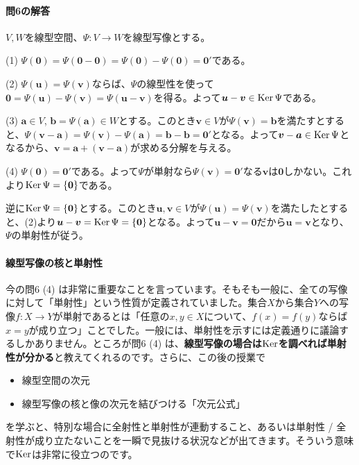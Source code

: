 \paragraph{問6の解答} $V, W$を線型空間、$\Psi\colon V\rightarrow W$を線型写像とする。

\noindent (1) $\Psi(\bm{0}) = \Psi(\bm{0} - \bm{0}) = \Psi(\bm{0}) - \Psi(\bm{0}) = \bm{0}'$である。

\noindent (2) $\Psi(\bm{u}) = \Psi(\bm{v})$ならば、$\Psi$の線型性を使って$\bm{0} = \Psi(\bm{u}) - \Psi(\bm{v}) = \Psi(\bm{u} - \bm{v})$を得る。よって$\boldsymbol{u} - \boldsymbol{v} \in \operatorname{Ker}\Psi$である。

\noindent (3) $\bm{a}\in V$, $\bm{b} = \Psi(\bm{a})\in W$とする。このとき$\bm{v}\in V$が$\Psi(\bm{v}) = \bm{b}$を満たすとすると、$\Psi(\bm{v} - \bm{a}) = \Psi(\bm{v}) - \Psi(\bm{a}) = \bm{b} - \bm{b} = \bm{0}'$となる。よって$\boldsymbol{v} - \boldsymbol{a} \in \operatorname{Ker}\Psi$となるから、$\bm{v} = \bm{a} + (\bm{v} - \bm{a})$が求める分解を与える。

\noindent (4) $\Psi(\bm{0}) = \bm{0}'$である。よって$\Psi$が単射なら$\Psi(\bm{v}) = \bm{0}'$なる$\bm{v}$は$\bm{0}$しかない。これより$\operatorname{Ker}\Psi=\{\boldsymbol{0}\}$である。

逆に$\operatorname{Ker}\Psi = \{\boldsymbol{0}\}$とする。このとき$\bm{u}, \bm{v}\in V$が$\Psi(\bm{u}) = \Psi(\bm{v})$を満たしたとすると、(2)より$\boldsymbol{u} - \boldsymbol{v} = \operatorname{Ker}\Psi = \{\boldsymbol{0}\}$となる。よって$\bm{u} - \bm{v} = \bm{0}$だから$\bm{u} = \bm{v}$となり、$\Psi$の単射性が従う。

\paragraph{線型写像の核と単射性}

今の問6 (4) は非常に重要なことを言っています。そもそも一般に、全ての写像に対して「単射性」という性質が定義されていました。集合$X$から集合$Y$への写像$f\colon X\rightarrow Y$が単射であるとは「任意の$x, y\in X$について、$f(x) = f(y)$ならば$x = y$が成り立つ」ことでした。一般には、単射性を示すには定義通りに議論するしかありません。ところが問6 (4) は、\textbf{線型写像の場合は$\operatorname{Ker}$を調べれば単射性が分かる}と教えてくれるのです。さらに、この後の授業で
\begin{itemize}
\item 線型空間の次元
\item 線型写像の核と像の次元を結びつける「次元公式」
\end{itemize}
を学ぶと、特別な場合に全射性と単射性が連動すること、あるいは単射性 / 全射性が成り立たないことを一瞬で見抜ける状況などが出てきます。そういう意味で$\operatorname{Ker}$は非常に役立つのです。

